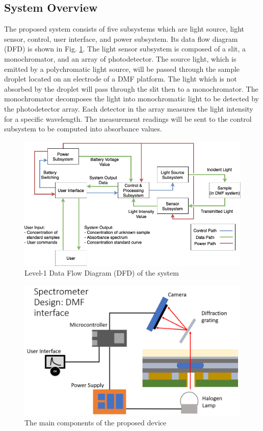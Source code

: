 \documentclass[conference]{IEEEtran}
\begin{document}
\subsection{System Overview}
The proposed system consists of five subsystems which are light source, light sensor, control, user interface, and power subsystem. Its data flow diagram (DFD) is shown in Fig. \ref{system-dfd}. The light sensor subsystem is composed of a slit, a monochromator, and an array of photodetector. The source light, which is emitted by a polychromatic light source, will be passed through the sample droplet located on an electrode of a DMF platform. The light which is not absorbed by the droplet will pass through the slit then to a monochromator. The monochromator decomposes the light into monochromatic light to be detected by the photodetector array. Each detector in the array measures the light intensity for a specific wavelength. The measurement readings will be sent to the control subsystem to be computed into absorbance values. 

    \begin{figure}[htbp]
    \centerline{\includegraphics[scale=0.27]{system-dfd.png}}
    \caption{Level-1 Data Flow Diagram (DFD) of the system}
    \label{system-dfd}
    \end{figure}

    \begin{figure}[htbp]
    \centerline{\includegraphics[scale=0.27]{dmf-hardware-scheme.png}}
    \caption{The main components of the proposed device}
    \label{dmf-hardware-scheme}
    \end{figure}
\end{document}
